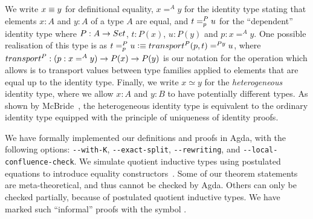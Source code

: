 \documentclass[a4paper,UKenglish,numberwithinsect,cleveref,thm-restate]{lipics-v2021}
\newcommand{\LT}[2][]{\todo[inline,author={L-T},caption={},#1]{#2}}
\begin{document}
We write $x \jdeq y$ for definitional equality, $x =^{A} y$ for the identity type stating that elements $x : A$ and $y : A$ of a type $A$ are equal, and $\dpath{P}{p}{t}{u}$ for the ``dependent'' identity type where $P : A \to \Set$, $t : P(x)$, $u : P(y)$ and $p : x =^A y$. One possible realisation of this type is as $t =^{P}_{p} u \defeq \transfib{P}{p}{t} =^{P y} u$, where $\transfibf{P} : (p : x =^A y) \to P(x) \to P(y)$ is our notation for the operation which allows is to transport values between type families applied to elements that are equal up to the identity type.
%
Finally, we write $x \simeq y$ for the \emph{heterogeneous} identity type, where we allow $x : A$ and $y : B$ to have potentially different types.
As shown by McBride~\cite{McBride1999}, the heterogeneous identity type is equivalent to the ordinary identity type equipped with the principle of uniqueness of identity proofs.

We have formally implemented our definitions and proofs in Agda, with the following options: \texttt{-{}-with-K}, \texttt{-{}-exact-split}, \texttt{-{}-rewriting}, and \texttt{-{}-local-confluence-check}. We simulate quotient inductive types using postulated equations to introduce equality constructors~\cite{Licata2011}.
Some of our theorem statements are meta-theoretical, and thus cannot be checked by Agda. Others can only be checked  partially, because of postulated quotient inductive types. We have marked such ``informal'' proofs with the symbol \resizebox*{!}{\baselineskip}{\textdbend}.

%
\end{document}
